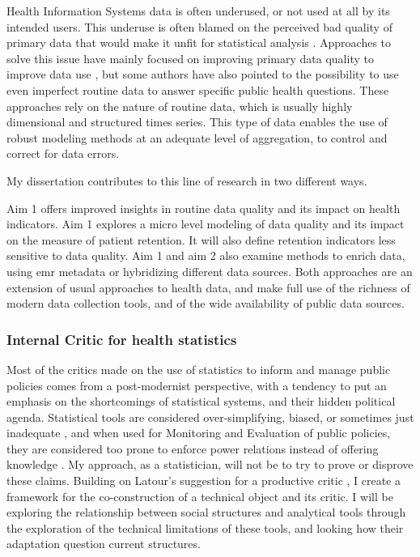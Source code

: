 Health Information Systems data is often underused, or not used at all by its intended users\citep{health_metrics_network_framework_2008}. This underuse is often blamed on the  perceived bad quality of primary data that would make it unfit for statistical analysis
\citep{ronveaux_immunization_2005,makombe_assessing_2008,heunis_accuracy_2011,gimbel_assessment_2011,who_assessment_2011,hahn_where_2013,kihuba_assessing_2014,glele_ahanhanzo_data_2015}. Approaches to solve this issue have mainly focused on improving primary data quality to improve data use  \citep{braa_improving_2012,mutale_improving_2013,ledikwe_improving_2014,nisingizwe_toward_2014}, but some authors have also pointed to the possibility to use even imperfect routine data to answer specific public health questions\citep{gething_improving_2006,gething_information_2007,wagenaar_using_2016}. These approaches rely on the nature of routine data, which is usually highly dimensional and structured times series. This type of data enables the use of robust modeling methods at an adequate level of aggregation, to control and correct for data errors.

My dissertation contributes to this line of research in two different ways.

Aim 1 offers improved insights in routine data quality and its impact on health indicators. Aim 1  explores a micro level modeling of data quality and its impact on the measure of patient retention. It will also define retention indicators less sensitive to data quality. Aim 1 and aim 2 also examine methods to enrich data, using \gls{emr} metadata or  hybridizing different data sources. Both approaches are an extension of usual approaches to health data, and make full use of the richness of modern data collection tools, and of the wide availability of public data sources.

\subsubsection{Internal Critic for health statistics}

Most of the critics made on the use of statistics to inform and manage public policies comes from a post-modernist perspective, with a tendency to put an emphasis on the shortcomings of statistical systems, and their hidden political agenda. Statistical tools are considered over-simplifying, biased, or sometimes just inadequate \citep{merry_measuring_2011}, and when used for Monitoring and Evaluation of public policies, they are considered too prone to enforce power relations instead of offering knowledge \citep{desrosieres_prouver_2014,gaudilliere_nouvel_2016}. My approach, as a statistician, will not be to try to prove or disprove these claims. Building on Latour's suggestion for a productive critic \citep{latour_why_2004}, I create a framework for the co-construction of a technical object and its critic. I will be exploring the relationship between social structures and analytical tools through the exploration of the technical limitations of these tools, and looking how their adaptation question current structures.

